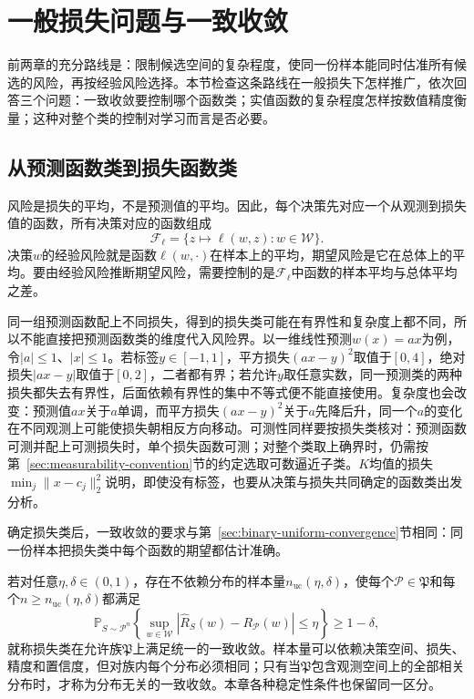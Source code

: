\section{一般损失问题与一致收敛}
\label{sec:real-valued-classes}
\label{sec:general-learning-problem}

前两章的充分路线是：限制候选空间的复杂程度，使同一份样本能同时估准所有候选的风险，再按经验风险选择。本节检查这条路线在一般损失下怎样推广，依次回答三个问题：一致收敛要控制哪个函数类；实值函数的复杂程度怎样按数值精度衡量；这种对整个类的控制对学习而言是否必要。

\subsection{从预测函数类到损失函数类}

风险是损失的平均，不是预测值的平均。因此，每个决策先对应一个从观测到损失值的函数，所有决策对应的函数组成
\[
 \mathcal F_\ell=\{z\mapsto\ell(w,z):w\in\mathcal W\}.
\]
决策$w$的经验风险就是函数$\ell(w,\cdot)$在样本上的平均，期望风险是它在总体上的平均。要由经验风险推断期望风险，需要控制的是$\mathcal F_\ell$中函数的样本平均与总体平均之差。

同一组预测函数配上不同损失，得到的损失类可能在有界性和复杂度上都不同，所以不能直接把预测函数类的维度代入风险界。以一维线性预测$w(x)=ax$为例，令$|a|\leq1$、$|x|\leq1$。若标签$y\in[-1,1]$，平方损失$(ax-y)^2$取值于$[0,4]$，绝对损失$|ax-y|$取值于$[0,2]$，二者都有界；若允许$y$取任意实数，同一预测类的两种损失都失去有界性，后面依赖有界性的集中不等式便不能直接使用。复杂度也会改变：预测值$ax$关于$a$单调，而平方损失$(ax-y)^2$关于$a$先降后升，同一个$a$的变化在不同观测上可能使损失朝相反方向移动。可测性同样要按损失类核对：预测函数可测并配上可测损失时，单个损失函数可测；对整个类取上确界时，仍需按第~\ref{sec:measurability-convention}节的约定选取可数逼近子类。$K$均值的损失$\min_j\|x-c_j\|_2^2$说明，即使没有标签，也要从决策与损失共同确定的函数类出发分析。

确定损失类后，一致收敛的要求与第~\ref{sec:binary-uniform-convergence}节相同：同一份样本把损失类中每个函数的期望都估计准确。

\label{def:general-uniform-convergence}
若对任意$\eta,\delta\in(0,1)$，存在不依赖分布的样本量$n_{\mathrm{uc}}(\eta,\delta)$，使每个$\mathcal P\in\mathfrak P$和每个$n\geq n_{\mathrm{uc}}(\eta,\delta)$都满足
\[
 \mathbb P_{S\sim\mathcal P^n}\!\left\{
 \sup_{w\in\mathcal W}|\hat R_S(w)-R_{\mathcal P}(w)|\leq\eta
 \right\}\geq1-\delta,
\]
就称损失类在允许族$\mathfrak P$上满足统一的一致收敛。样本量可以依赖决策空间、损失、精度和置信度，但对族内每个分布必须相同；只有当$\mathfrak P$包含观测空间上的全部相关分布时，才称为分布无关的一致收敛。本章各种稳定性条件也保留同一区分。

